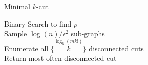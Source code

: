 \documentclass[12pt]{article}
\begin{document}
\LinesNumbered
\begin{algorithm}[H]
\caption{Minimal $k$-cut}
Binary Search to find $p$ \\
Sample $\log(n)/\epsilon^2$ sub-graphs \\
Enumerate all $\{\overset{\log_k(mk!)}{k} \}$ disconnected cuts \\
Return most often disconnected cut
\end{algorithm}
\end{document}
